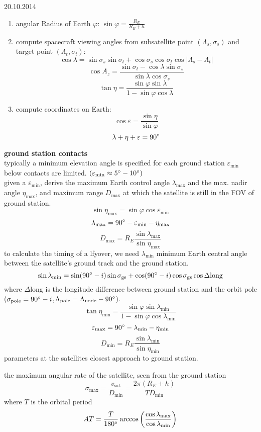 \begin{chapter}{20.10.2014}
\begin{enumerate}[1)]
 \item angular Radius of Earth $\varphi$: $\sin \varphi = \frac{R_E}{R_E+h}$
 \item compute spacecraft viewing angles from subsatellite point $(\Lambda_s,\sigma_s)$ and target point $(\Lambda_t,\sigma_t)$:
 \[\cos \lambda = \sin\sigma_s \sin\sigma_t+\cos\sigma_s \cos\sigma_t \cos |\Lambda_s-\Lambda_t|\]
 \[\cos A_z = \frac{\sin\sigma_t-\cos\lambda\sin\sigma_s}{\sin\lambda\cos\sigma_s}\]
 \[\tan \eta = \frac{\sin \varphi \sin \lambda}{1-\sin \varphi \cos \lambda}\]
 \item compute coordinates on Earth:
 \[\cos \varepsilon = \frac{\sin\eta}{\sin\varphi}\]
 \[\lambda + \eta+\varepsilon = 90 \degree\]
\end{enumerate}

\textbf{ground station contacts}\\
typically a minimum elevation angle is specified for each ground station $\varepsilon_\text{min}$ below contacts are limited. $(\varepsilon_\text{min} \approx 5\degree-10\degree)$\\
given a $\varepsilon_\text{min}$, derive the maximum Earth control angle $\lambda_\text{max}$ and the max. nadir angle $\eta_\text{max}$, and maximum range $D_\text{max}$ at which the satellite is still in the FOV of ground station.
\[\sin\eta_\text{max} = \sin\varphi\cos\varepsilon_\text{min}\]
\[\lambda_\text{max} = 90\degree -\varepsilon_\text{min} - \eta_\text{max}\]
\[D_\text{max} = R_E\frac{\sin\lambda_\text{max}}{\sin\eta_\text{max}}\]
to calculate the timing of a lfyover, we need $\lambda_\text{min}$ minimum Earth central angle between the satellite's ground track and the ground station.
\[ \sin \lambda_\text{min} = \sin (90\degree-i)\sin \sigma_\text{gs}+\cos (90\degree-i)\cos \sigma_\text{gs} \cos\Delta\text{long} \]
 where $\Delta$long is the longitude difference between ground station and the orbit pole \\($\sigma_\text{pole} = 90\degree -i$,$\Lambda_\text{pole} = \Lambda_\text{node}-90\degree$).
 \[ \tan \eta_\text{min} = \frac{\sin \varphi \sin \lambda_\text{min}}{1-\sin \varphi \cos \lambda_\text{min}} \]
 \[\varepsilon_\text{max} = 90\degree-\lambda_\text{min}-\eta_\text{min}\]
 \[D_\text{min} = R_E \frac{\sin \lambda_\text{min}}{\sin \eta_\text{min}}\]
 parameters at the satellites closest approach to ground station.
 
 the maximum angular rate of the satellite, seen from the ground station
 \[ \sigma_\text{max} = \frac{v_\text{sat}}{D_\text{min}}=\frac{2\pi(R_E + h)}{T D_\text{min}}\]
 where $T$ is the orbital period
  \[ AT = \frac{T}{180\degree} \arccos \left( \frac{\cos \lambda_\text{max}}{\cos \lambda_\text{min}} \right) \]
 
\end{chapter}
